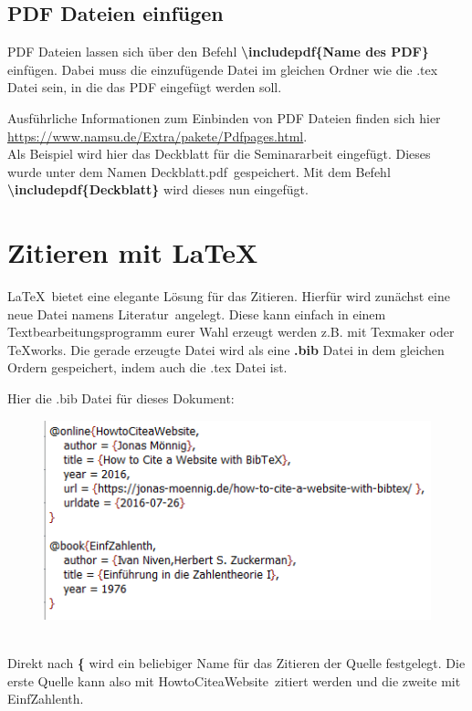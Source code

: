 \documentclass[a4paper, 12pt]{scrreprt}
\begin{document}
\section{PDF Dateien einfügen}
PDF Dateien lassen sich über den Befehl \textbf{\textbackslash includepdf\{Name des PDF\}} einfügen. Dabei muss die einzufügende Datei im gleichen Ordner wie die .tex Datei sein, in die das PDF eingefügt werden soll. 

Ausführliche Informationen zum Einbinden von PDF Dateien finden sich hier \href{https://www.namsu.de/Extra/pakete/Pdfpages.html}{https://www.namsu.de/Extra/pakete/Pdfpages.html}.\\
Als Beispiel wird hier das Deckblatt für die Seminararbeit eingefügt. Dieses wurde unter dem Namen \glqq Deckblatt.pdf\grqq\, gespeichert. Mit dem Befehl\\  \textbf{\textbackslash includepdf\{Deckblatt\}} wird dieses nun eingefügt.


\chapter{Zitieren mit \LaTeX}
\LaTeX\, bietet eine elegante Lösung für das Zitieren. Hierfür wird zunächst eine neue Datei namens \glqq Literatur\grqq\, angelegt. Diese kann einfach in einem Textbearbeitungsprogramm eurer Wahl erzeugt werden z.B. mit Texmaker oder TeXworks. Die gerade erzeugte Datei wird als eine \textbf{.bib} Datei in dem gleichen Ordern gespeichert, indem auch die .tex Datei ist. 

Hier die .bib Datei für dieses Dokument:\\
\begin{figure}[h]
\centering
\includegraphics{Literatur}
\end{figure}\hfill\\
Direkt nach \textbf{\{} wird ein beliebiger Name für das Zitieren der Quelle festgelegt. Die erste Quelle kann also mit \glqq HowtoCiteaWebsite\grqq\, zitiert werden und die zweite mit \glqq EinfZahlenth\grqq.
\end{document}
